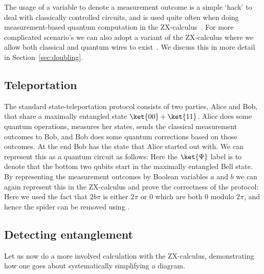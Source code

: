 \documentclass[a4paper,onecolumn,superscriptaddress,11pt,%
				unpublished,%
				allowfontchageintitle,%
				]{quantumarticle}
\begin{document}
The usage of a variable to denote a measurement outcome is a simple `hack' to deal with classically controlled circuits, and is used quite often when doing measurement-based quantum computation in the ZX-calculus~\cite{kissinger2017MBQC,wetering-gflow}.
For more complicated scenario's we can also adopt a variant of the ZX-calculus where we allow both classical and quantum wires to exist~\cite{coecke_paquette_pavlovic_2009,coecke2016categorical}. We discuss this in more detail in Section~\ref{sec:doubling}.


\subsection{Teleportation}\label{sec:teleportation}
The standard state-teleportation protocol consists of two parties, Alice and Bob, that share a maximally entangled state $\ket{00}+\ket{11}$. Alice does some quantum operations, measures her states, sends the classical measurement outcomes to Bob, and Bob does some quantum corrections based on those outcomes. At the end Bob has the state that Alice started out with. We can represent this as a quantum circuit as follows:
Here the $\ket{\Psi}$ label is to denote that the bottom two qubits start in the maximally entangled Bell state. By representing the measurement outcomes by Boolean variables $a$ and $b$ we can again represent this in the ZX-calculus and prove the correctness of the protocol:
Here we used the fact that $2b\pi$ is either $2\pi$ or $0$ which are both $0$ modulo $2\pi$, and hence the spider can be removed using \IdRule.


\subsection{Detecting entanglement}
Let us now do a more involved calculation with the ZX-calculus, demonstrating how one goes about systematically simplifying a diagram.
\end{document}
